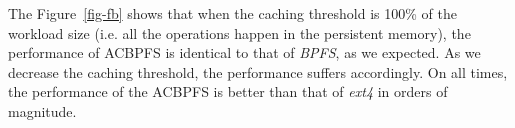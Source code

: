 The Figure~\ref{fig-fb} shows that when the caching threshold is 100\% of the workload size (i.e. all the operations happen in the persistent memory), the performance of AC\-BPFS is identical to that of \textit{BPFS}, as we expected. As we decrease the caching threshold, the performance suffers accordingly. On all times, the performance of the AC\-BPFS is better than that of \textit{ext4}  in orders of magnitude.